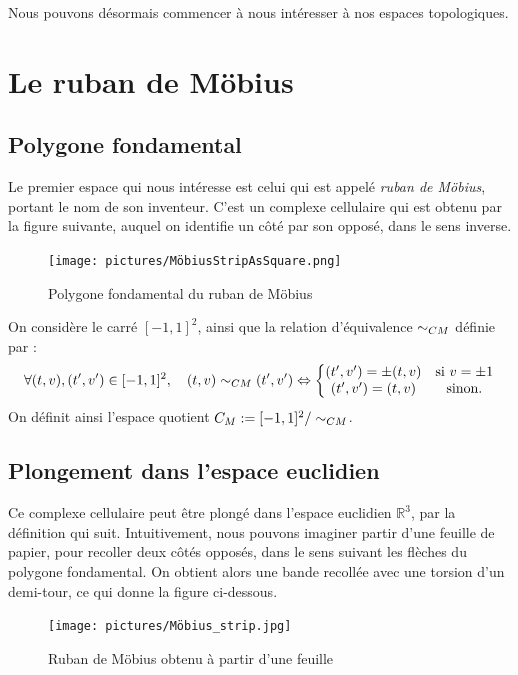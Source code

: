 \documentclass[hidelinks, 10pt]{article}
\begin{document}
\bigskip Nous pouvons désormais commencer à nous intéresser à nos espaces topologiques.

\newpage

\section{Le ruban de Möbius}
\subsection{Polygone fondamental}

Le premier espace qui nous intéresse est celui qui est appelé \emph{ruban de Möbius}, portant le nom de son inventeur. C'est un complexe cellulaire qui est obtenu par la figure suivante, auquel on identifie un côté par son opposé, dans le sens inverse.

\begin{figure}[H]
    \centering
    \texttt{[image: pictures/MöbiusStripAsSquare.png]}
    \caption{Polygone fondamental du ruban de Möbius}
    \label{fig:mobius-square}
\end{figure}

\begin{definition}
On considère le carré $[-1,1]^2$, ainsi que la relation d'équivalence $\sim_{CM}$ définie par : \[\forall(t,v),(t',v')\in[-1,1]^2,\quad (t,v)\sim_{CM}(t',v')\Leftrightarrow \left\{\begin{matrix}
(t',v')=\pm(t,v)& \text{si }v=\pm1\\
(t',v')=(t,v) & \text{sinon.}
\end{matrix}\right.\]On définit ainsi l'espace quotient $C_M:=[-1,1]^2/\sim_{CM}$.
\end{definition}

\subsection{Plongement dans l'espace euclidien}

Ce complexe cellulaire peut être plongé dans l'espace euclidien $\mathbb{R}^3$, par la définition qui suit. Intuitivement, nous pouvons imaginer partir d'une feuille de papier, pour recoller deux côtés opposés, dans le sens suivant les flèches du polygone fondamental. On obtient alors une bande recollée avec une torsion d'un demi-tour, ce qui donne la figure ci-dessous.

\begin{figure}[H]
    \centering
    \texttt{[image: pictures/Möbius\_strip.jpg]}
    \caption{Ruban de Möbius obtenu à partir d'une feuille}
    \label{fig:mobius-strip}
\end{figure}
\end{document}

